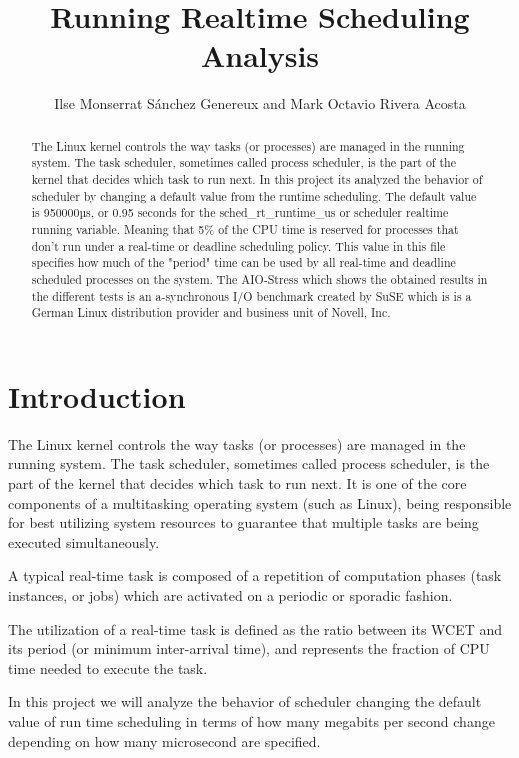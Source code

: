 \documentclass[a4paper]{article}
\title{Running Realtime Scheduling Analysis}
\author{Ilse Monserrat Sánchez Genereux and Mark Octavio Rivera Acosta}
\begin{document}
\maketitle

\begin{abstract}
The Linux kernel controls the way tasks (or processes) are managed in the running system. The task scheduler, sometimes called process scheduler, is the part of the kernel that decides which task to run next. In this project its analyzed the behavior of scheduler by changing a default value from the runtime scheduling. 
The default value is 950000µs, or 0.95 seconds for the sched\_rt\_runtime\_us or scheduler realtime running variable. Meaning that 5\% of the CPU time is reserved for processes that don't run under a real-time or deadline scheduling policy. This value in this file specifies how much of the "period" time can be used by all real-time and deadline scheduled processes on the system.
The AIO-Stress which shows the obtained results in the different tests is an a-synchronous I/O benchmark created by SuSE which is is a German Linux distribution provider and business unit of Novell, Inc.
\end{abstract}

\section{Introduction}

The Linux kernel controls the way tasks (or processes) are managed in the running system. The task scheduler, sometimes called process scheduler, is the part of the kernel that decides which task to run next. It is one of the core components of a multitasking operating system (such as Linux), being responsible for best utilizing system resources to guarantee that multiple tasks are being executed simultaneously. 

\setlength{\parskip}{3mm}

A typical real-time task is composed of a repetition of computation phases (task instances, or jobs) which are activated on a periodic or sporadic fashion.

\setlength{\parskip}{3mm}

The utilization of a real-time task is defined as the ratio between its WCET and its period (or minimum inter-arrival time), and represents the fraction of CPU time needed to execute the task.

\setlength{\parskip}{3mm}

In this project we will analyze the behavior of scheduler changing the default value of run time scheduling in terms of how many megabits per second change depending on how many microsecond are specified. 
\end{document}
